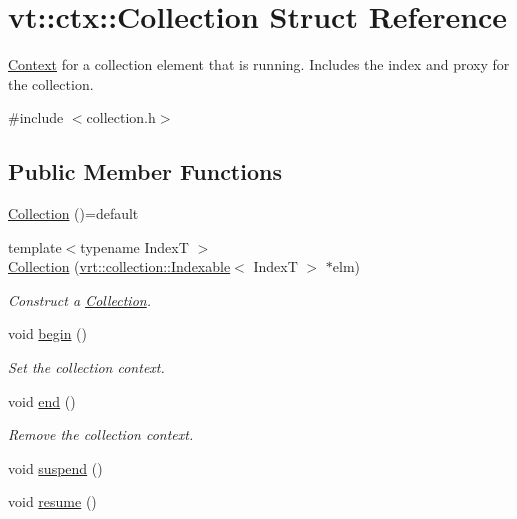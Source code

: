 \hypertarget{structvt_1_1ctx_1_1_collection}{}\section{vt\+:\+:ctx\+:\+:Collection Struct Reference}
\label{structvt_1_1ctx_1_1_collection}


\hyperlink{structvt_1_1ctx_1_1_context}{Context} for a collection element that is running. Includes the index and proxy for the collection.  




{\ttfamily \#include $<$collection.\+h$>$}

\subsection*{Public Member Functions}
\begin{DoxyCompactItemize}
\item 
\hyperlink{structvt_1_1ctx_1_1_collection_a19c7871680086e92be70f24d58bb0321}{Collection} ()=default
\item 
{\footnotesize template$<$typename IndexT $>$ }\\\hyperlink{structvt_1_1ctx_1_1_collection_a461f8690260111c0dd2f21bd1b3acf6c}{Collection} (\hyperlink{structvt_1_1vrt_1_1collection_1_1_indexable}{vrt\+::collection\+::\+Indexable}$<$ IndexT $>$ $\ast$elm)
\begin{DoxyCompactList}\small\item\em Construct a {\ttfamily \hyperlink{structvt_1_1ctx_1_1_collection}{Collection}}. \end{DoxyCompactList}\item 
void \hyperlink{structvt_1_1ctx_1_1_collection_a35d61c84c87b9bc99143ac42353c3c20}{begin} ()
\begin{DoxyCompactList}\small\item\em Set the collection context. \end{DoxyCompactList}\item 
void \hyperlink{structvt_1_1ctx_1_1_collection_a0eb284fb05d2e4d36183afc753038ec3}{end} ()
\begin{DoxyCompactList}\small\item\em Remove the collection context. \end{DoxyCompactList}\item 
void \hyperlink{structvt_1_1ctx_1_1_collection_a39de5ab4cdfb27951f981cd3c43a7ee0}{suspend} ()
\item 
void \hyperlink{structvt_1_1ctx_1_1_collection_a86fc6bda09b1cc705c99f7ccfba01fa2}{resume} ()
\end{DoxyCompactItemize}
